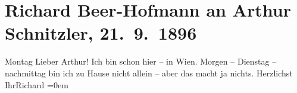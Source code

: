 

         \renewcommand{\erwaehnteOrte}{Orte: Wien}
         \renewcommand{\erwaehnteWerke}{}
               \section[Richard Beer-Hofmann an Arthur Schnitzler, 21. 9. 1896]{ Richard Beer-Hofmann an Arthur Schnitzler, 21. 9. 1896}\nopagebreak{}\rehead{ }\begin{ledgroupsized}[t]{13cm}\normalsize\beginnumbering \toendnotes[C]{\smallbreak\pagebreak[2]} 
\pstart
           \raggedleft{}{\pb}Montag\pend
           \pstart{}Lieber Arthur!\pend\pstart
           Ich bin schon hier – in Wien. Morgen –
                  Dienstag – nachmittag bin ich zu Hause nicht allein –
               aber das macht ja nichts.\pend
           \pstart
           Herzlichst{\\[\baselineskip]}Ihr\spacefill\mbox{Richard}\pend
           \leftskip=0em{}
         
         \endnumbering{}\end{ledgroupsized}  \newcommand{\dateiname}{L00597}\newcommand{\titel}{Richard Beer-Hofmann an Arthur Schnitzler, 21. 9. 1896}\newcommand{\editorInnen}{Martin Anton Müller und Gerd-Hermann Susen}
      
